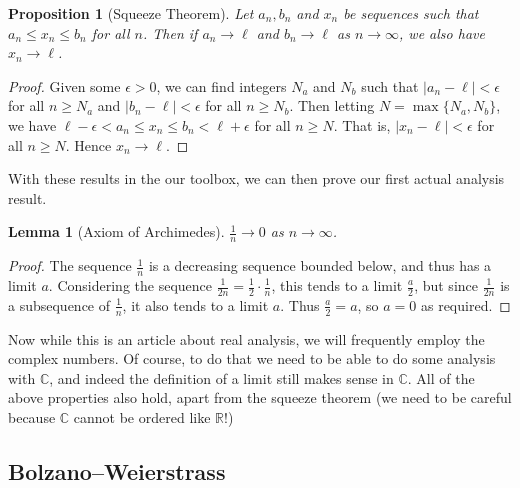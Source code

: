 \documentclass[11pt, a4paper]{article}
\newtheorem{proposition}[theorem]{Proposition}
\newtheorem{lemma}[theorem]{Lemma}
\theoremstyle{definition}
\newtheorem{example}[theorem]{Example}
\newcommand{\C}{\mathbb{C}}
\newcommand{\R}{\mathbb{R}}
\begin{document}
\begin{proposition}[Squeeze Theorem]
	Let $a_n, b_n$ and $x_n$ be sequences such that $a_n \leq x_n \leq b_n$ for all $n$. Then if $a_n \rightarrow \ell$ and $b_n \rightarrow \ell$ as $n \rightarrow \infty$, we also have $x_n \rightarrow \ell$.
\end{proposition}
\begin{proof}
Given some $\epsilon > 0$, we can find integers $N_a$ and $N_b$ such that $|a_n - \ell| < \epsilon$  for all $n \geq N_a$ and $|b_n - \ell| < \epsilon$ for all $n \geq N_b$. Then letting $N = \max\{N_a, N_b\}$, we have $\ell - \epsilon < a_n \leq x_n \leq b_n < \ell + \epsilon$ for all $n \geq N$. That is, $|x_n - \ell| < \epsilon$ for all $n \geq N$. Hence $x_n \rightarrow \ell$.
\end{proof}


With these results in the our toolbox, we can then prove our first actual analysis result.

\begin{lemma}[Axiom of Archimedes]
	$\frac{1}{n} \rightarrow 0$ as $n \rightarrow \infty$.
\end{lemma}
\begin{proof}
	The sequence $\frac{1}{n}$ is a decreasing sequence bounded below, and thus has a limit $a$. Considering the sequence $\frac{1}{2n} = \frac{1}{2}\cdot \frac{1}{n}$, this tends to a limit $\frac{a}{2}$, but since $\frac{1}{2n}$ is a subsequence of $\frac{1}{n}$, it also tends to a limit $a$. Thus $\frac{a}{2}=a$, so $a = 0$ as required.
\end{proof}






Now while this is an article about real analysis, we will frequently employ the complex numbers. Of course, to do that we need to be able to do some analysis with $\C$, and indeed the definition of a limit still makes sense in $\C$. All of the above properties also hold, apart from the squeeze theorem (we need to be careful because $\C$ cannot be ordered like $\R$!)

\subsection{Bolzano–Weierstrass}
\end{document}

